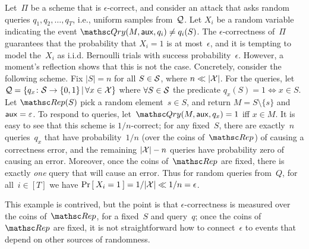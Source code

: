 \def\bin{{\sf Bin}}
Let~$\Pi$ be a scheme that is $\epsilon$-correct, and consider an attack that 
asks random queries $q_1,q_2,\ldots,q_T$, i.e., uniform samples from~${\cal Q}$.
Let $X_i$ be a random variable indicating the event $\Qry(M,\aux,q_i)\neq q_i(S)$.  
The $\epsilon$-correctness of~$\Pi$ guarantees that the probability that $X_i=1$ is at most~$\epsilon$, 
and it is tempting to model the~$X_i$ as i.i.d. Bernoulli trials with success probability~$\epsilon$.
However, a moment's reflection shows that this is not the case.  Concretely, consider the following scheme.  Fix $|S|=n$ for all $S \in {\cal S}$, where $n \ll |{\cal X}|$.  For the queries, let ${\cal Q} = \{q_x\colon {\cal S} \to \{0,1\} \,|\, \forall x \in {\cal X}\}$ where $\forall S \in {\cal S}$ the predicate $q_x(S)=1 \Leftrightarrow x \in S$.  Let $\Rep(S)$ pick a random element~$s \in S$, and return $M = S \setminus \{s\}$ and ${\sf aux} = \varepsilon$.  To respond to queries, let~$\Qry(M,\aux,q_x)=1$ iff $x \in M$.  It is easy to see that this scheme is $1/n$-correct; for any fixed~$S$, there are exactly~$n$ queries~$q_x$ that have probability~$1/n$  (over the coins of~$\Rep$) of causing a correctness error, and the remaining $|{\cal X}|-n$ queries have probability zero of causing an error.  Moreover, once the coins of~$\Rep$ are fixed, there is exactly \emph{one} query that will cause an error.  Thus for random queries from~$Q$, for all~$i\in[T]$ we have $\Pr\left[\: X_i=1 \:\right]=1/|{\cal X}| \ll 1/n = \epsilon$.

This example is contrived, but the point is that $\epsilon$-correctness is measured over the coins of~$\Rep$, for a fixed~$S$ and query~$q$; once the coins of~$\Rep$ are fixed, it is not straightforward how to connect~$\epsilon$ to events that depend on other sources of randomness. 


